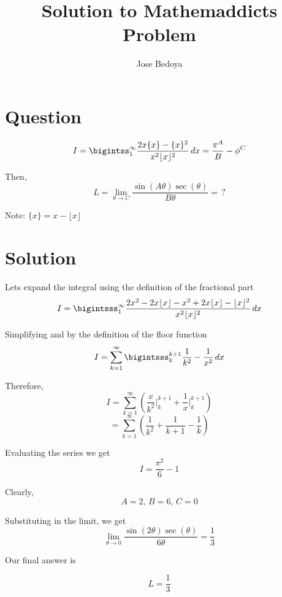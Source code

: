 \documentclass{article}
\begin{document}
\pagecolor{Blue}
\title{Solution to Mathemaddict\textsc{}s Problem}
\author{Jose Bedoya}
\maketitle
\section{Question}
{\LARGE
$$I=\bigintss_{1}^{\infty} \frac{2x\{x\}-\{x\}^2}{x^2\lfloor x\rfloor^2}\,dx=\frac{\pi^A}{B}-\phi^C$$

\vspace{4mm}
Then,
$$L=\lim_{\theta\to C} \frac{\sin\left(A\theta\right)\sec \left(\theta\right)}{B\theta}=\,?$$

\vspace{3mm}
Note: $\{x\}=x-\lfloor x\rfloor$
}
\section{Solution}
{\Large
Let\textsc{}s expand the integral using the definition of the fractional part
$$I=\bigintsss_{1}^{\infty}\frac{2x^2-2x\lfloor x\rfloor-x^2+2x\lfloor x\rfloor-\lfloor x\rfloor^2}{x^2\lfloor x\rfloor^2}\,dx $$

\vspace{5mm}
Simplifying and by the definition of the floor function 
$$I=\sum_{k=1}^{\infty}\bigintsss_{k}^{k+1}\frac{1}{k^2}-\frac{1}{x^2}\,dx$$

\vspace{4mm}
Therefore,
\newpage
$$I=\sum_{k=1}^{\infty}\left(\frac{x}{k^2}\Big|_k^{k+1}+\frac{1}{x}\Big|_k^{k+1}\right)$$
$$=\sum_{k=1}^{\infty}\left(\frac{1}{k^2}+\frac{1}{k+1}-\frac{1}{k}\right)$$

\vspace{3mm}
Evaluating the series we get
$$I=\frac{\pi^2}{6}-1$$

\vspace{3mm}
Clearly,
$$A=2,\,B=6,\, C=0$$

\vspace{5mm}
Substituting in the limit, we get
$$\lim_{\theta\to0} \frac{\sin\left(2\theta\right)\sec\left(\theta\right)}{6\theta}=\frac{1}{3}$$

\vspace{3mm}
Our final answer is
}
{\LARGE
$$L=\frac{1}{3}$$
}
\end{document}
